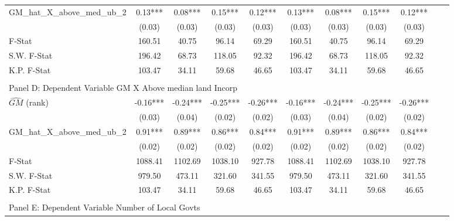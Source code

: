 \begin{table}[htbp]
\begin{threeparttable}
\begin{tabular}{l*{10}{c}}
\addlinespace
GM\_hat\_X\_above\_med\_ub\_2&       0.13***&       0.08***&       0.15***&       0.12***&       0.13***&       0.08***&       0.15***&       0.12***\\
                &     (0.03)   &     (0.03)   &     (0.03)   &     (0.03)   &     (0.03)   &     (0.03)   &     (0.03)   &     (0.03)   \\
\midrule
F-Stat          &     160.51   &      40.75   &      96.14   &      69.29   &     160.51   &      40.75   &      96.14   &      69.29   \\
S.W. F-Stat     &     196.42   &      68.73   &     118.05   &      92.32   &     196.42   &      68.73   &     118.05   &      92.32   \\
K.P. F-Stat     &     103.47   &      34.11   &      59.68   &      46.65   &     103.47   &      34.11   &      59.68   &      46.65   \\
\cmidrule[\heavyrulewidth](lr){1-9} \\ \cmidrule[\heavyrulewidth](lr){1-9}
\multicolumn{8}{l}{Panel D: Dependent Variable GM X Above median land Incorp}\\
\cmidrule(lr){1-9}
$\hat{GM}$ (rank)&      -0.16***&      -0.24***&      -0.25***&      -0.26***&      -0.16***&      -0.24***&      -0.25***&      -0.26***\\
                &     (0.03)   &     (0.04)   &     (0.02)   &     (0.02)   &     (0.03)   &     (0.04)   &     (0.02)   &     (0.02)   \\
\addlinespace
GM\_hat\_X\_above\_med\_ub\_2&       0.91***&       0.89***&       0.86***&       0.84***&       0.91***&       0.89***&       0.86***&       0.84***\\
                &     (0.02)   &     (0.02)   &     (0.02)   &     (0.02)   &     (0.02)   &     (0.02)   &     (0.02)   &     (0.02)   \\
\midrule
F-Stat          &    1088.41   &    1102.69   &    1038.10   &     927.78   &    1088.41   &    1102.69   &    1038.10   &     927.78   \\
S.W. F-Stat     &     979.50   &     473.11   &     321.60   &     341.55   &     979.50   &     473.11   &     321.60   &     341.55   \\
K.P. F-Stat     &     103.47   &      34.11   &      59.68   &      46.65   &     103.47   &      34.11   &      59.68   &      46.65   \\
\cmidrule[\heavyrulewidth](lr){1-9} \\ \cmidrule[\heavyrulewidth](lr){1-9}
\multicolumn{8}{l}{Panel E: Dependent Variable Number of Local Govts}\\

\end{tabular}
\end{threeparttable}
\end{table}
